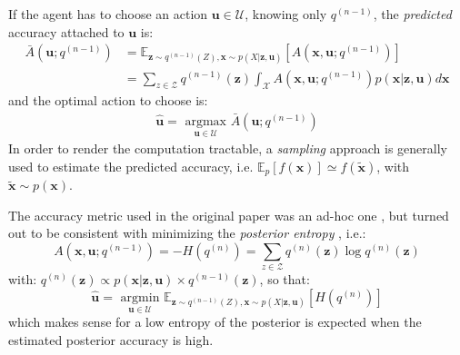 \documentclass[12pt,twoside,openright]{article}
\begin{document}
If the agent has to choose an action $\boldsymbol{u} \in \mathcal{U}$, knowing only $q^{(n-1)}$, the \emph{predicted} accuracy attached to $\boldsymbol{u}$ is:
\begin{align*}
\bar{A}(\boldsymbol{u}; q^{(n-1)})
&= \mathbb{E}_{\boldsymbol{z} \sim q^{(n-1)}(Z), \boldsymbol{x} \sim p(X|\boldsymbol{z}, \boldsymbol{u})}\left[A(\boldsymbol{x}, \boldsymbol{u}; q^{(n-1)})\right]  \\
&= \sum_{z\in\mathcal{Z}} q^{(n-1)}(\boldsymbol{z}) \int_{\mathcal{X}}  A(\boldsymbol{x}, \boldsymbol{u}; q^{(n-1)}) p(\boldsymbol{x}|\boldsymbol{z}, \boldsymbol{u}) d\boldsymbol{x}  
\end{align*}
and the optimal action to choose is:
\begin{align}
\hat{\boldsymbol{u}} = \underset{\boldsymbol{u} \in \mathcal{U}}{\text{ argmax }} \bar{A}(\boldsymbol{u}; q^{(n-1)})\label{eq:predictive-policy}
\end{align} 
In order to render the computation tractable, a \emph{sampling} approach is generally used to estimate the predicted accuracy, i.e. $\mathbb{E}_p[f(\boldsymbol{x})] \simeq f(\tilde{\boldsymbol{x}})$, with $\tilde{\boldsymbol{x}}\sim p(\boldsymbol{x})$.

The accuracy metric used in the original paper was an ad-hoc one \citep{najemnik2005optimal}, but turned out to be consistent with minimizing the \emph{posterior entropy} \citep{najemnik2009simple}, i.e.:
$$A(\boldsymbol{x}, \boldsymbol{u}; q^{(n-1)}) = -H(q^{(n)}) = \sum_{z \in \mathcal{Z}} q^{(n)}(\boldsymbol{z}) \log q^{(n)}(\boldsymbol{z})$$
with: $q^{(n)}(\boldsymbol{z}) \propto p(\boldsymbol{x|\boldsymbol{z}, \boldsymbol{u}}) \times q^{(n-1)}(\boldsymbol{z}) $,
so that:
$$\hat{\boldsymbol{u}} = \underset{\boldsymbol{u} \in \mathcal{U}}{\text{ argmin }} \mathbb{E}_{\boldsymbol{z} \sim q^{(n-1)}(Z), \boldsymbol{x} \sim p(X|\boldsymbol{z}, \boldsymbol{u})}\left[H(q^{(n)})\right] $$ 
which makes sense for a low entropy of the posterior is expected when the estimated posterior accuracy is high.
\end{document}

